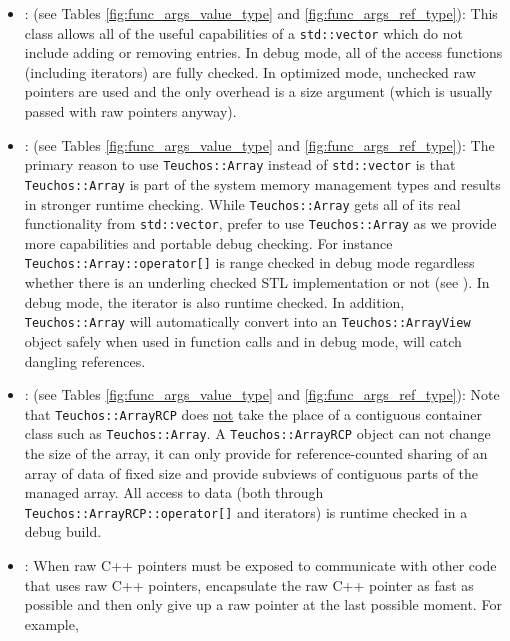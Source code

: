 \begin{itemize}
{}\item\GCGTeuchosArrayView: (see Tables
{}\ref{fig:func_args_value_type} and {}\ref{fig:func_args_ref_type}):
This class allows all of the useful capabilities of a
{}\texttt{std::vector} which do not include adding or removing
entries.  In debug mode, all of the access functions (including
iterators) are fully checked.  In optimized mode, unchecked raw
pointers are used and the only overhead is a size argument (which is
usually passed with raw pointers anyway).

{}\item\GCGTeuchosArray: (see Tables {}\ref{fig:func_args_value_type}
and {}\ref{fig:func_args_ref_type}): The primary reason to use
{}\texttt{Teuchos::\-Array} instead of {}\texttt{std::\-vector} is
that {}\texttt{Teuchos::\-Array} is part of the system memory
management types and results in stronger runtime checking.  While
{}\texttt{Teuchos::\-Array} gets all of its real functionality from
{}\texttt{std::\-vector}, prefer to use {}\texttt{Teuchos::\-Array} as
we provide more capabilities and portable debug checking.  For
instance {}\texttt{Teuchos::\-Array::\-operator[]} is range checked in
debug mode regardless whether there is an underling checked STL
implementation or not (see {}\cite[Item 83]{C++CodingStandards05}).
In debug mode, the iterator is also runtime checked.  In addition,
{}\texttt{Teuchos\-::Array} will automatically convert into an
{}\texttt{Teuchos\-::ArrayView} object safely when used in function
calls and in debug mode, will catch dangling references.

{}\item\GCGTeuchosArrayRCP: (see Tables
{}\ref{fig:func_args_value_type} and {}\ref{fig:func_args_ref_type}):
Note that {}\texttt{Teuchos::ArrayRCP} does {}\underline{not} take the
place of a contiguous container class such as
{}\texttt{Teuchos::\-Array}.  A {}\texttt{Teuchos::ArrayRCP} object
can not change the size of the array, it can only provide for
reference-counted sharing of an array of data of fixed size and
provide subviews of contiguous parts of the managed array.  All access
to data (both through {}\texttt{Teuchos::\-ArrayRCP::\-operator[]} and
iterators) is runtime checked in a debug build.

{}\item\GCGPostponeRawPointers: When raw C++ pointers must be exposed to
communicate with other code that uses raw C++ pointers, encapsulate the raw
C++ pointer as fast as possible and then only give up a raw pointer at the
last possible moment.  For example, 


\end{itemize}
